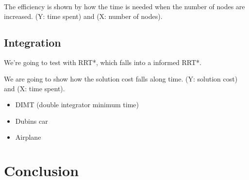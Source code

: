 \documentclass[letterpaper, 10 pt, conference]{ieeeconf}  %
\begin{document}
The efficiency is shown by how the time is needed when the number of nodes are increased.
(Y: time spent) and (X: number of nodes).

\subsection{Integration}

We're going to test with RRT*, which falls into a informed RRT*.

We are going to show how the solution cost falls along time.
(Y: solution cost) and (X: time spent).

\begin{itemize}
\item DIMT (double integrator minimum time)
\item Dubins car
\item Airplane
\end{itemize}

\section{Conclusion}








%
\end{document}
